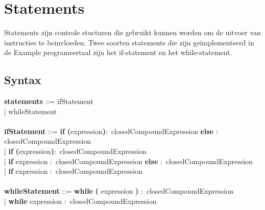 \section{Statements}
Statements zijn controle stucturen die gebruikt kunnen worden om de uitvoer van instructies te beinvloeden. Twee soorten statements die zijn ge\"{i}mplementeerd in de Example programeertaal zijn het if-statement en het while-statement.
    \subsection{Syntax}
        \begin{tabbing}
        {\bf statements}                  ::= \=ifStatement\\
                                          \>| whileStatement\\
        \\
        {\bf ifStatement}                 ::= \=\textbf{if} \=\textbf{(}expression\textbf{)}$\colon$ closedCompoundExpression \textbf    {else} $\colon$ closedCompoundExpression\\
                                      \>| \textbf{if} \textbf{(}expression\textbf{)}$\colon$ closedCompoundExpression\\
                                      \>| \textbf{if} expression $\colon$ closedCompoundExpression \textbf{else} $\colon$ closedCompoundExpression\\
                                      \>| \textbf{if} expression $\colon$ closedCompoundExpression\\
        \\
        {\bf whileStatement}              ::= \=\textbf{while} \textbf{(} expression \textbf{)} $\colon$ closedCompoundExpression\\
                                      \>| \textbf{while} expression $\colon$ closedCompoundExpression\\
        \\ 
        \end{tabbing}
